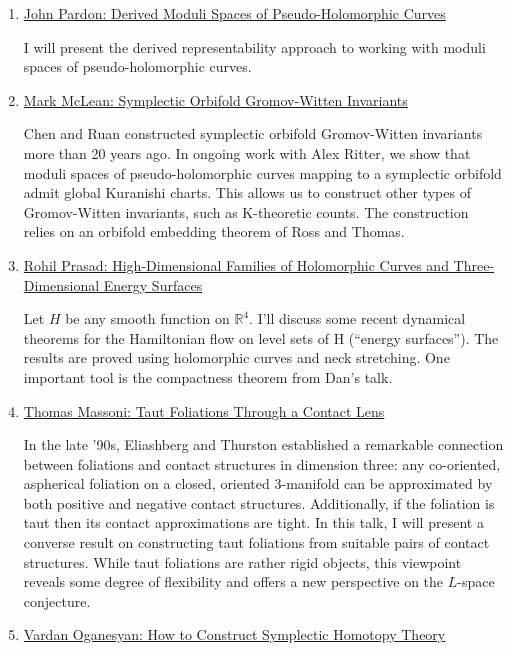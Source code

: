 \begin{partbacktext}
\begin{enumerate}
    \item \href{#pardon}{John Pardon: Derived Moduli Spaces of Pseudo-Holomorphic Curves}
    
    I will present the derived representability approach to working with moduli spaces of pseudo-holomorphic curves.

    \item \href{#mclean}{Mark McLean: Symplectic Orbifold Gromov-Witten Invariants}
    
    Chen and Ruan constructed symplectic orbifold Gromov-Witten invariants more than 20 years ago. In ongoing work with Alex Ritter, we show that moduli spaces of pseudo-holomorphic curves mapping to a symplectic orbifold admit global Kuranishi charts. This allows us to construct other types of Gromov-Witten invariants, such as K-theoretic counts. The construction relies on an orbifold embedding theorem of Ross and Thomas.

    \item \href{#prasad}{Rohil Prasad: High-Dimensional Families of Holomorphic Curves and Three-Dimensional Energy Surfaces}
    
    Let $H$ be any smooth function on $\mathbb{R}^4$. I’ll discuss some recent dynamical theorems for the Hamiltonian flow on level sets of H (“energy surfaces”). The results are proved using holomorphic curves and neck stretching. One important tool is the compactness theorem from Dan’s talk.

    \item \href{#massoni}{Thomas Massoni: Taut Foliations Through a Contact Lens}
    
    In the late ’90s, Eliashberg and Thurston established a remarkable connection between foliations and contact structures in dimension three: any co-oriented, aspherical foliation on a closed, oriented 3-manifold can be approximated by both positive and negative contact structures. Additionally, if the foliation is taut then its contact approximations are tight. In this talk, I will present a converse result on constructing taut foliations from suitable pairs of contact structures. While taut foliations are rather rigid objects, this viewpoint reveals some degree of flexibility and offers a new perspective on the $L$-space conjecture.

    \item \href{#oganesyan}{Vardan Oganesyan: How to Construct Symplectic Homotopy Theory}
    

\end{enumerate}
\end{partbacktext}
